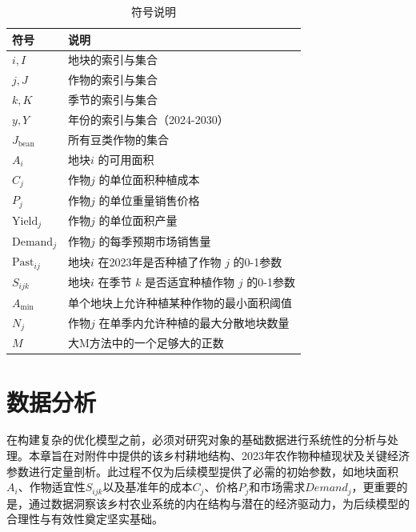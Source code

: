 \documentclass[withoutpreface,bwprint]{cumcmthesis} %
\begin{document}
\begin{table}[H]
	\centering
	\caption{符号说明}
	\begin{tabular}{ll}
		\toprule
		符号                 & 说明                                \\
		\midrule

		$i, I$             & 地块的索引与集合                          \\
		$j, J$             & 作物的索引与集合                          \\
		$k, K$             & 季节的索引与集合                          \\
		$y, Y$             & 年份的索引与集合（2024-2030）               \\
		$J_{\text{bean}}$  & 所有豆类作物的集合                         \\

		$A_i$              & 地块$i$ 的可用面积                       \\
		$C_j$              & 作物$j$ 的单位面积种植成本                   \\
		$P_j$              & 作物$j$ 的单位重量销售价格                   \\
		$\text{Yield}_j$   & 作物$j$ 的单位面积产量                     \\
		$\text{Demand}_j$  & 作物$j$ 的每季预期市场销售量                  \\
		$\text{Past}_{ij}$ & 地块$i$ 在2023年是否种植了作物 $j$ 的0-1参数    \\
		$S_{ijk}$          & 地块$i$ 在季节 $k$ 是否适宜种植作物 $j$ 的0-1参数 \\
		$A_{\min}$         & 单个地块上允许种植某种作物的最小面积阈值              \\
		$N_j$              & 作物$j$ 在单季内允许种植的最大分散地块数量           \\
		$M$                & 大M方法中的一个足够大的正数                    \\
		\bottomrule
	\end{tabular}
\end{table}


\section{数据分析}


在构建复杂的优化模型之前，必须对研究对象的基础数据进行系统性的分析与处理。本章旨在对附件中提供的该乡村耕地结构、2023年农作物种植现状及关键经济参数进行定量剖析。此过程不仅为后续模型提供了必需的初始参数，如地块面积$A_i$、作物适宜性$S_{ijk}$以及基准年的成本$C_j$、价格$P_j$和市场需求$Demand_j$，更重要的是，通过数据洞察该乡村农业系统的内在结构与潜在的经济驱动力，为后续模型的合理性与有效性奠定坚实基础。
\end{document}
